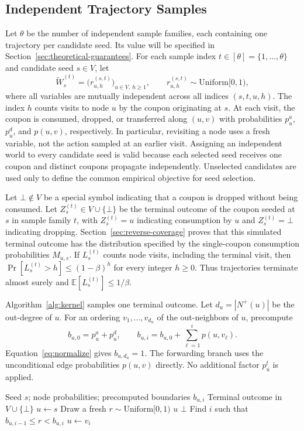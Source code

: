 \documentclass[sigconf]{acmart}
\begin{document}
\subsection{Independent Trajectory Samples}
\label{sec:source-worlds}

Let $\theta$ be the number of independent sample families, each
containing one trajectory per candidate seed. Its value will be
specified in Section~\ref{sec:theoretical-guarantees}.
For each sample index $t\in[\theta]=\{1,\ldots,\theta\}$ and
candidate seed $s\in V$, let
\[
  \widetilde W_s^{(t)}
  =\bigl(r_{u,h}^{(s,t)}\bigr)_{u\in V,\ h\ge1},
  \qquad r_{u,h}^{(s,t)}\sim\mathrm{Uniform}[0,1),
\]
where all variables are mutually independent across all indices
$(s,t,u,h)$. The index $h$ counts visits to node $u$ by the coupon
originating at $s$. At each visit, the coupon is consumed, dropped,
or transferred along $(u,v)$ with probabilities $p_u^a$, $p_u^d$,
and $p(u,v)$, respectively. In particular, revisiting a node uses
a fresh variable, not the action sampled at an earlier visit.
Assigning an independent world to every candidate seed is valid
because each selected seed receives one coupon and distinct coupons
propagate independently. Unselected candidates are used only to
define the common empirical objective for seed selection.

Let $\bot\notin V$ be a special symbol indicating that a coupon
is dropped without being consumed.
Let $Z_s^{(t)}\in V\cup\{\bot\}$ be the terminal outcome of the
coupon seeded at $s$ in sample family $t$, with
$Z_s^{(t)}=u$ indicating consumption by $u$ and $Z_s^{(t)}=\bot$
indicating dropping. Section~\ref{sec:reverse-coverage} proves that
this simulated terminal outcome has the distribution specified by
the single-coupon consumption probabilities $M_{u,s}$.
If $L_s^{(t)}$ counts node visits, including the terminal visit,
then $\Pr[L_s^{(t)}>h]\le(1-\beta)^h$ for every integer $h\ge0$.
Thus trajectories terminate almost surely and
$\mathbb E[L_s^{(t)}]\le1/\beta$.

Algorithm~\ref{alg:kernel} samples one terminal outcome.
Let $d_u=|N^+(u)|$ be the out-degree of $u$. For an ordering
$v_1,\ldots,v_{d_u}$ of the out-neighbors of $u$, precompute
\[
 b_{u,0}=p_u^a+p_u^d,\qquad
 b_{u,i}=b_{u,0}+\sum_{\ell=1}^{i}p(u,v_\ell).
\]
Equation~\eqref{eq:normalize} gives $b_{u,d_u}=1$.
The forwarding branch uses the unconditional edge probabilities
$p(u,v)$ directly. No additional factor $p_u^t$ is applied.

\begin{algorithm}[t]
\caption{\textsc{SampleTerminalConsumer}$(s)$}
\label{alg:kernel}
\begin{algorithmic}[1]
\Require Seed $s$; node probabilities; precomputed boundaries $b_{u,i}$
\Ensure Terminal outcome in $V\cup\{\bot\}$
\State $u\gets s$
  \State Draw a fresh $r\sim\mathrm{Uniform}[0,1)$
    \State \Return $u$
    \State \Return $\bot$
  \Else
    \State Find $i$ such that $b_{u,i-1}\le r<b_{u,i}$
    \State $u\gets v_i$
  \EndIf
\EndWhile
\end{algorithmic}
\end{algorithm}
\end{document}

